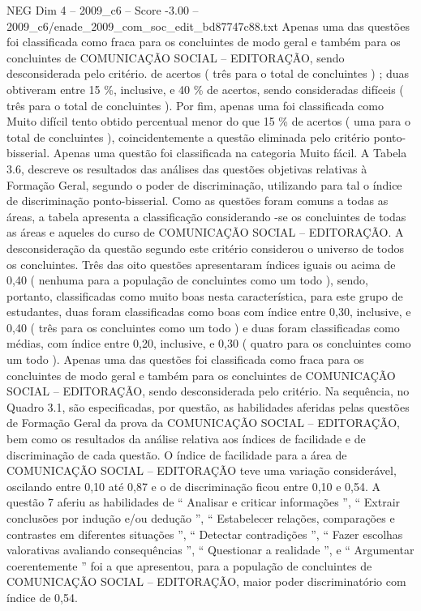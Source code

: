 \begin{textsample}{NEG Dim 4 – 2009\_c6 – Score -3.00 – 2009\_c6/enade\_2009\_com\_soc\_edit\_bd87747c88.txt}
Apenas uma das questões foi classificada como fraca para os concluintes de modo geral e também para os concluintes de COMUNICAÇÃO SOCIAL – EDITORAÇÃO, sendo desconsiderada pelo critério. de acertos ( três para o total de concluintes ) ; duas obtiveram entre 15 \%, inclusive, e 40 \% de acertos, sendo consideradas difíceis ( três para o total de concluintes ).
Por fim, apenas uma foi classificada como Muito difícil tento obtido percentual menor do que 15 \% de acertos ( uma para o total de concluintes ), coincidentemente a questão eliminada pelo critério ponto-bisserial.
Apenas uma questão foi classificada na categoria Muito fácil.
A Tabela 3.6, descreve os resultados das análises das questões objetivas relativas à Formação Geral, segundo o poder de discriminação, utilizando para tal o índice de discriminação ponto-bisserial.
Como as questões foram comuns a todas as áreas, a tabela apresenta a classificação considerando -se os concluintes de todas as áreas e aqueles do curso de COMUNICAÇÃO SOCIAL – EDITORAÇÃO.
A desconsideração da questão segundo este critério considerou o universo de todos os concluintes.
Três das oito questões apresentaram índices iguais ou acima de 0,40 ( nenhuma para a população de concluintes como um todo ), sendo, portanto, classificadas como muito boas nesta característica, para este grupo de estudantes, duas foram classificadas como boas com índice entre 0,30, inclusive, e 0,40 ( três para os concluintes como um todo ) e duas foram classificadas como médias, com índice entre 0,20, inclusive, e 0,30 ( quatro para os concluintes como um todo ).
Apenas uma das questões foi classificada como fraca para os concluintes de modo geral e também para os concluintes de COMUNICAÇÃO SOCIAL – EDITORAÇÃO, sendo desconsiderada pelo critério.
Na sequência, no Quadro 3.1, são especificadas, por questão, as habilidades aferidas pelas questões de Formação Geral da prova da COMUNICAÇÃO SOCIAL – EDITORAÇÃO, bem como os resultados da análise relativa aos índices de facilidade e de discriminação de cada questão.
O índice de facilidade para a área de COMUNICAÇÃO SOCIAL – EDITORAÇÃO teve uma variação considerável, oscilando entre 0,10 até 0,87 e o de discriminação ficou entre 0,10 e 0,54.
A questão 7 aferiu as habilidades de “ Analisar e criticar informações ”, “ Extrair conclusões por indução e/ou dedução ”, “ Estabelecer relações, comparações e contrastes em diferentes situações ”, “ Detectar contradições ”, “ Fazer escolhas valorativas avaliando consequências ”, “ Questionar a realidade ”, e “ Argumentar coerentemente ” foi a que apresentou, para a população de concluintes de COMUNICAÇÃO SOCIAL – EDITORAÇÃO, maior poder discriminatório com índice de 0,54.

\end{textsample}
